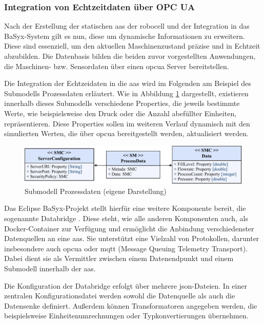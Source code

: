 \subsubsection{Integration von Echtzeitdaten über OPC UA}
Nach der Erstellung der statischen \acs{aas} der robocell und der Integration in das BaSyx-System gilt es nun, diese um dynamische Informationen zu erweitern.
Diese sind essenziell, um den aktuellen Maschinenzustand präzise und in Echtzeit abzubilden.
Die Datenbasis bilden die beiden zuvor vorgestellten Anwendungen, die Maschinen- bzw. Sensordaten über einen \acs{opcua} Server bereitstellen.

Die Integration der Echtzeidaten in die \acs{aas} wird im Folgenden am Beispiel des Submodells Prozessdaten erläutert.
Wie in Abbildung \ref{fig:SubmodellProzessdaten} dargestellt, existieren innerhalb dieses Submodells verschiedene Properties, die jeweils bestimmte Werte, wie beispielsweise den Druck oder die Anzahl abefüllter Einheiten, repräsentieren. %
Diese Properties sollen im weiteren Verlauf dynamisch mit den simulierten Werten, die über \acs{opcua} bereitgestellt werden, aktualisiert werden.

\begin{figure}[htbp]
    \centering
    \includegraphics[width=1\textwidth]{Bilder/OPCUA/SubmodellProzessdaten.pdf}
    \caption[Submodell Prozessdaten]{Submodell Prozessdaten (eigene Darstellung)}
    \label{fig:SubmodellProzessdaten}
\end{figure}

Das Eclipse BaSyx-Projekt stellt hierfür eine weitere Komponente bereit, die sogenannte Databridge \cite{BaSyxDatabridge}.
Diese steht, wie alle anderen Komponenten auch, als Docker-Container zur Verfügung und ermöglicht die Anbindung verschiedenster Datenquellen an eine \acs{aas}.
Sie unterstützt eine Vielzahl von Protokollen, darunter insbesondere auch \acs{opcua} oder \acs{mqtt} (Message Queuing Telemetry Transport).
Dabei dient sie als Vermittler zwischen einem Datenendpunkt und einem Submodell innerhalb der \acs{aas}.

Die Konfiguration der Databridge erfolgt über mehrere \acs{json}-Dateien.
In einer zentralen Konfigurationsdatei werden sowohl die Datenquelle als auch die Datensenke definiert.
Außerdem können Transformatoren angegeben werden, die beispielsweise Einheitenumrechnungen oder Typkonvertierungen übernehmen.

